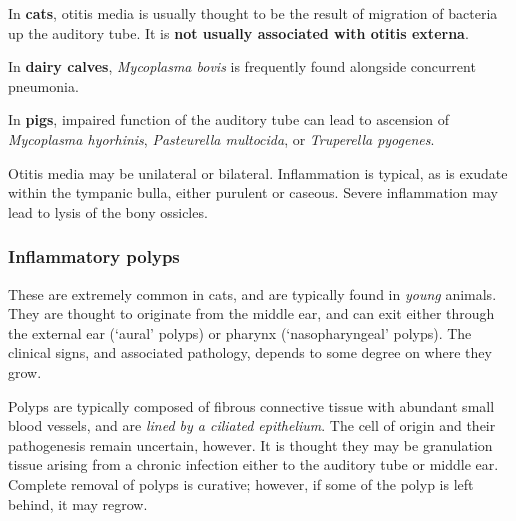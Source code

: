 \documentclass[openany]{article}
\begin{document}
In \textbf{cats}, otitis media is usually thought to be the result of
migration of bacteria up the auditory tube. It is \textbf{not usually
associated with otitis externa}.

In \textbf{dairy calves}, \emph{Mycoplasma bovis} is frequently found
alongside concurrent pneumonia.

In \textbf{pigs}, impaired function of the auditory tube can lead to
ascension of \emph{Mycoplasma hyorhinis}, \emph{Pasteurella multocida},
or \emph{Truperella pyogenes}.

Otitis media may be unilateral or bilateral. Inflammation is typical, as
is exudate within the tympanic bulla, either purulent or caseous. Severe
inflammation may lead to lysis of the bony ossicles.

\subsubsection{Inflammatory polyps}\label{inflammatory-polyps}

These are extremely common in cats, and are typically found in
\emph{young} animals. They are thought to originate from the middle ear,
and can exit either through the external ear (`aural' polyps) or pharynx
(`nasopharyngeal' polyps). The clinical signs, and associated pathology,
depends to some degree on where they grow.

Polyps are typically composed of fibrous connective tissue with abundant
small blood vessels, and are \emph{lined by a ciliated epithelium}. The
cell of origin and their pathogenesis remain uncertain, however. It is
thought they may be granulation tissue arising from a chronic infection
either to the auditory tube or middle ear. Complete removal of polyps is
curative; however, if some of the polyp is left behind, it may regrow.


\end{document}
